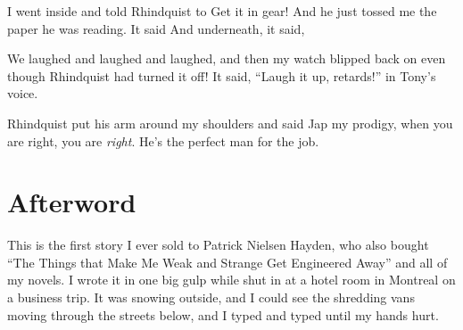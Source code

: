 I went inside and told Rhindquist to Get it in gear! And he just tossed 
me the paper he was reading. It said 
 And underneath, it said, 

We laughed and laughed and laughed, and then my watch blipped back on 
even though Rhindquist had turned it off! It said, “Laugh it up, 
retards!” in Tony's voice.

Rhindquist put his arm around my shoulders and said Jap my prodigy, 
when you are right, you are \emph{right}. He's the perfect man for the 
job.

\section{Afterword}

This is the first story I ever sold to Patrick Nielsen Hayden, who also 
bought “The Things that Make Me Weak and Strange Get Engineered 
Away” and all of my novels. I wrote it in one big gulp while shut in 
at a hotel room in Montreal on a business trip. It was snowing outside, 
and I could see the shredding vans moving through the streets below, 
and I typed and typed until my hands hurt.

